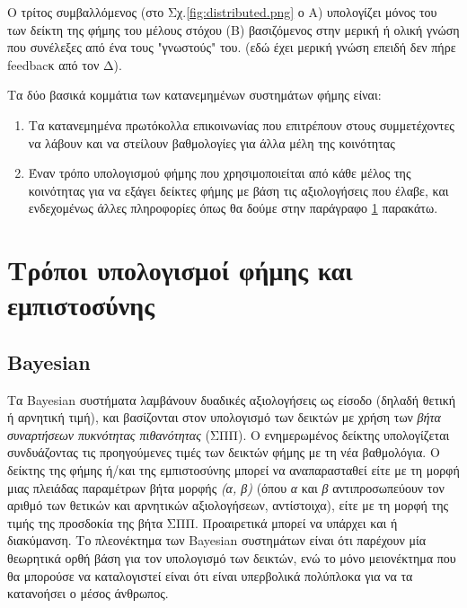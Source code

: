 
Ο τρίτος συμβαλλόμενος (στο Σχ.\ref{fig:distributed.png}  ο Α) υπολογίζει μόνος του των δείκτη της φήμης του μέλους στόχου (Β) βασιζόμενος στην μερική ή ολική γνώση που συνέλεξες από ένα τους "γνωστούς" του. (εδώ έχει μερική γνώση επειδή δεν πήρε feedbacκ από τον Δ).

Τα δύο βασικά κομμάτια των κατανεμημένων συστημάτων φήμης είναι:
\begin{enumerate}

\item Tα κατανεμημένα πρωτόκολλα επικοινωνίας που επιτρέπουν στους συμμετέχοντες να λάβουν και να στείλουν βαθμολογίες για άλλα μέλη της κοινότητας

\item Έναν τρόπο υπολογισμού φήμης που χρησιμοποιείται από κάθε μέλος της κοινότητας για να εξάγει δείκτες φήμης με βάση τις αξιολογήσεις που έλαβε, και ενδεχομένως άλλες πληροφορίες όπως θα δούμε στην παράγραφο \ref{sec:compute} παρακάτω.

\end{enumerate}

\section{Τρόποι υπολογισμοί φήμης και εμπιστοσύνης}\label{sec:compute}

\subsection{Bayesian}

Τα Bayesian συστήματα λαμβάνουν δυαδικές αξιολογήσεις ως είσοδο (δηλαδή θετική ή αρνητική τιμή), και βασίζονται στον υπολογισμό των δεικτών  με χρήση των \textit{βήτα συναρτήσεων πυκνότητας πιθανότητας} (ΣΠΠ). Ο  ενημερωμένος δείκτης υπολογίζεται συνδυάζοντας τις προηγούμενες τιμές των δεικτών φήμης με τη νέα βαθμολόγια.%
 Ο δείκτης της φήμης ή/και της εμπιστοσύνης μπορεί να αναπαρασταθεί είτε με τη μορφή μιας πλειάδας παραμέτρων βήτα μορφής \textit{(α, β)} (όπου \textit{α} και \textit{β} αντιπροσωπεύουν τον αριθμό των θετικών και αρνητικών αξιολογήσεων, αντίστοιχα), είτε με τη μορφή της τιμής της προσδοκία της βήτα ΣΠΠ. Προαιρετικά μπορεί να υπάρχει και ή διακύμανση. Το πλεονέκτημα των Bayesian συστημάτων είναι ότι παρέχουν μία θεωρητικά ορθή βάση για τον υπολογισμό των δεικτών, ενώ το μόνο μειονέκτημα που θα μπορούσε να καταλογιστεί είναι ότι είναι υπερβολικά πολύπλοκα για να τα κατανοήσει ο μέσος άνθρωπος.

